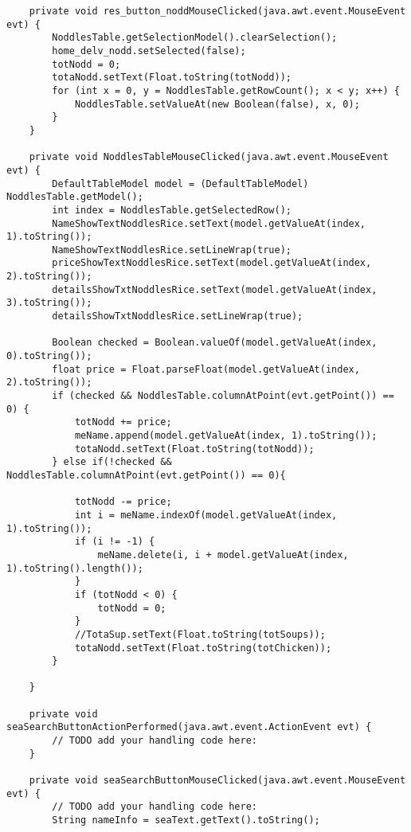 \documentclass[12pt,a4paper]{article}
\begin{document}
\begin{lstlisting}
    private void res_button_noddMouseClicked(java.awt.event.MouseEvent evt) {                                             
        NoddlesTable.getSelectionModel().clearSelection();
        home_delv_nodd.setSelected(false);
        totNodd = 0;
        totaNodd.setText(Float.toString(totNodd));
        for (int x = 0, y = NoddlesTable.getRowCount(); x < y; x++) {
            NoddlesTable.setValueAt(new Boolean(false), x, 0);
        }
    }                                            

    private void NoddlesTableMouseClicked(java.awt.event.MouseEvent evt) {                                          
        DefaultTableModel model = (DefaultTableModel) NoddlesTable.getModel();
        int index = NoddlesTable.getSelectedRow();
        NameShowTextNoddlesRice.setText(model.getValueAt(index, 1).toString());
        NameShowTextNoddlesRice.setLineWrap(true);
        priceShowTextNoddlesRice.setText(model.getValueAt(index, 2).toString());
        detailsShowTxtNoddlesRice.setText(model.getValueAt(index, 3).toString());
        detailsShowTxtNoddlesRice.setLineWrap(true);

        Boolean checked = Boolean.valueOf(model.getValueAt(index, 0).toString());
        float price = Float.parseFloat(model.getValueAt(index, 2).toString());
        if (checked && NoddlesTable.columnAtPoint(evt.getPoint()) == 0) {
            totNodd += price;
            meName.append(model.getValueAt(index, 1).toString());
            totaNodd.setText(Float.toString(totNodd));
        } else if(!checked && NoddlesTable.columnAtPoint(evt.getPoint()) == 0){
            
            totNodd -= price;
            int i = meName.indexOf(model.getValueAt(index, 1).toString());
            if (i != -1) {
                meName.delete(i, i + model.getValueAt(index, 1).toString().length());
            }
            if (totNodd < 0) {
                totNodd = 0;
            }
            //TotaSup.setText(Float.toString(totSoups));
            totaNodd.setText(Float.toString(totChicken));
        }

    }                                         

    private void seaSearchButtonActionPerformed(java.awt.event.ActionEvent evt) {                                                
        // TODO add your handling code here:
    }                                               

    private void seaSearchButtonMouseClicked(java.awt.event.MouseEvent evt) {                                             
        // TODO add your handling code here:
        String nameInfo = seaText.getText().toString();


\end{lstlisting}
\end{document}
